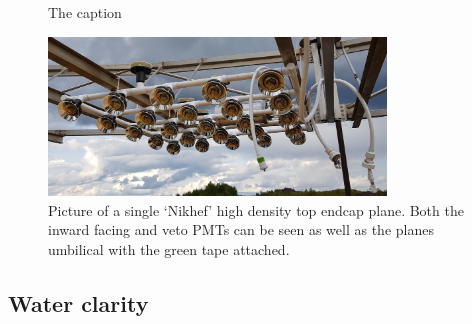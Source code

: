 \begin{figure} %
    \centering
    \quad
    \caption[The caption]
    {The caption}
\end{figure}

\begin{figure} %
    \includegraphics[width=0.8\textwidth]{diagrams/4-chips/single_plane.jpg}
    \caption[Picture of a single `Nikhef' plane.]
    {Picture of a single `Nikhef' high density top endcap plane. Both the inward facing and veto
        PMTs can be seen as well as the planes umbilical with the green tape attached.}
    \label{fig:single_plane}
\end{figure}

\subsection{Water clarity} %
\label{sec:chips_detector_water} %

